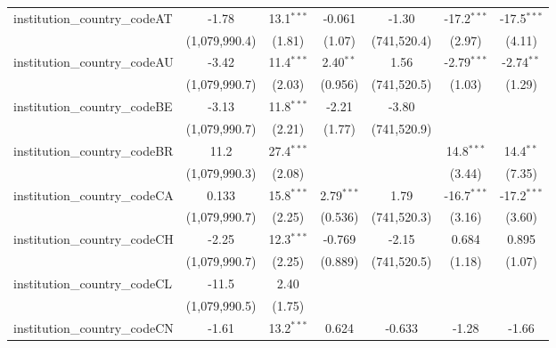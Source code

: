 \begin{tabular}{lcccccc}
   institution\_country\_codeAT          & -1.78         & 13.1$^{***}$  & -0.061        & -1.30         & -17.2$^{***}$ & -17.5$^{***}$\\   
                                         & (1,079,990.4) & (1.81)        & (1.07)        & (741,520.4)   & (2.97)        & (4.11)\\   
   institution\_country\_codeAU          & -3.42         & 11.4$^{***}$  & 2.40$^{**}$   & 1.56          & -2.79$^{***}$ & -2.74$^{**}$\\   
                                         & (1,079,990.7) & (2.03)        & (0.956)       & (741,520.5)   & (1.03)        & (1.29)\\   
   institution\_country\_codeBE          & -3.13         & 11.8$^{***}$  & -2.21         & -3.80         &               &   \\   
                                         & (1,079,990.7) & (2.21)        & (1.77)        & (741,520.9)   &               &   \\   
   institution\_country\_codeBR          & 11.2          & 27.4$^{***}$  &               &               & 14.8$^{***}$  & 14.4$^{**}$\\   
                                         & (1,079,990.3) & (2.08)        &               &               & (3.44)        & (7.35)\\   
   institution\_country\_codeCA          & 0.133         & 15.8$^{***}$  & 2.79$^{***}$  & 1.79          & -16.7$^{***}$ & -17.2$^{***}$\\   
                                         & (1,079,990.7) & (2.25)        & (0.536)       & (741,520.3)   & (3.16)        & (3.60)\\   
   institution\_country\_codeCH          & -2.25         & 12.3$^{***}$  & -0.769        & -2.15         & 0.684         & 0.895\\   
                                         & (1,079,990.7) & (2.25)        & (0.889)       & (741,520.5)   & (1.18)        & (1.07)\\   
   institution\_country\_codeCL          & -11.5         & 2.40          &               &               &               &   \\   
                                         & (1,079,990.5) & (1.75)        &               &               &               &   \\   
   institution\_country\_codeCN          & -1.61         & 13.2$^{***}$  & 0.624         & -0.633        & -1.28         & -1.66\\   

\end{tabular}
